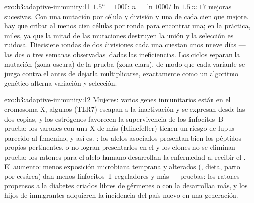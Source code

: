\begin{solution}{exo:b3:adaptive-immunity:11}
$1.5^{n} = 1000$: $n = \ln 1000/\ln 1.5 \approx 17$ mejoras sucesivas.
Con una mutación por célula y división y una de cada cien que mejore, hay
que cribar al menos cien células por ronda para encontrar una; en la
práctica, miles, ya que la mitad de las mutaciones destruyen la unión y
la selección es ruidosa. Diecisiete rondas de dos divisiones cada una
cuestan unos nueve días --- las dos o tres semanas observadas, dadas las
ineficiencias. Los ciclos separan la mutación (zona oscura) de la prueba
(zona clara), de modo que cada variante se juzga contra el  antes
de dejarla multiplicarse, exactamente como un algoritmo genético alterna
variación y selección.
\end{solution}

\begin{solution}{exo:b3:adaptive-immunity:12}
Mujeres: varios genes inmunitarios están en el cromosoma X, algunos
(TLR7) escapan a la inactivación y se expresan desde las dos copias, y
los estrógenos favorecen la supervivencia de los linfocitos~B --- prueba:
los varones con una X de más (Klinefelter) tienen un riesgo de lupus
parecido al femenino, y así es. : los alelos asociados presentan bien
los péptidos propios pertinentes, o no logran presentarlos en el  y
los clones no se eliminan --- prueba: los ratones  para el
alelo humano desarrollan la enfermedad al recibir el . El
aumento: menos exposición microbiana temprana y  alterados
(, dieta, parto por cesárea) dan menos linfocitos~T
reguladores y más  --- pruebas: los ratones propensos a la
diabetes criados libres de gérmenes o con  la desarrollan
más, y los hijos de inmigrantes adquieren la incidencia del país nuevo en
una generación.
\end{solution}

